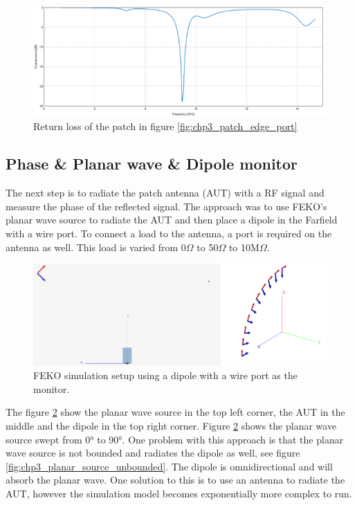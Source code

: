     \begin{figure}[H]
    \centering
    \includegraphics[width=0.95\linewidth]{Figures/chp3_patch_edge_port_S11.png}
    \caption{Return loss of the patch in figure \ref{fig:chp3_patch_edge_port}}
    \label{fig:chp3_patch_edge_port_S11}
    \end{figure}

\subsection{{Phase \& Planar wave \& Dipole monitor}}
The next step is to radiate the patch antenna (AUT) with a RF signal and measure the phase of the reflected signal. The approach was to use FEKO’s planar wave source to radiate the AUT and then place a dipole in the Farfield with a wire port. To connect a load to the antenna, a port is required on the antenna as well. This load is varied from 0$\Omega$ to 50$\Omega$ to 10M$\Omega$.

    \begin{figure}[H]
    \centering
    \includegraphics[width=0.8\linewidth]{Figures/chp3_simulation_setup.png}
    \caption{FEKO simulation setup using a dipole with a wire port as the monitor.}
    \label{fig:chp3_simulation_setup}
    \end{figure}

The figure \ref{fig:chp3_simulation_setup} show the planar wave source in the top left corner, the AUT in the middle and the dipole in the top right corner. Figure \ref{fig:chp3_simulation_setup} shows the planar wave source swept from 0° to 90°. One problem with this approach is that the planar wave source is not bounded and radiates the dipole as well, see figure \ref{fig:chp3_planar_source_unbounded}. The dipole is omnidirectional and will absorb the planar wave. One solution to this is to use an antenna to radiate the AUT, however the simulation model becomes exponentially more complex to run.

